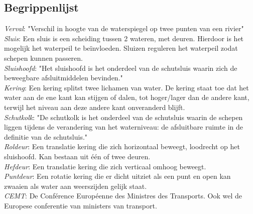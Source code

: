 \documentclass[../verslag.tex]{subfiles}
\begin{document}
\subsection{Begrippenlijst}
\emph{Verval}: "Verschil in hoogte van de waterspiegel op twee punten van een rivier" \cite{dvd_verval}\\
\emph{Sluis}: Een sluis is een scheiding tussen 2 wateren, met deuren. Hierdoor is het mogelijk het waterpeil te beïnvloeden. Sluizen reguleren het waterpeil zodat schepen kunnen passeren. \cite{rws_2022}\\
\emph{Sluishoofd}: "Het sluishoofd is het onderdeel van de schutsluis waarin zich de beweegbare afsluitmiddelen bevinden." \cite{bezuijen_2000}\\
\emph{Kering}: Een kering splitst twee lichamen van water. De kering staat toe dat het water aan de ene kant kan stijgen of dalen, tot hoger/lager dan de andere kant, terwijl het niveau aan deze andere kant onveranderd blijft. \cite{rws_2018}\\
\emph{Schutkolk}: "De schutkolk is het onderdeel van de schutsluis waarin de schepen liggen tijdens de verandering van het waterniveau: de afsluitbare ruimte in de definitie van de schutsluis." \cite{bezuijen_2000}\\
\emph{Roldeur}: Een translatie kering die zich horizontaal beweegt, loodrecht op het sluishoofd. Kan bestaan uit één of twee deuren. \cite{bezuijen_2000}\\
\emph{Hefdeur}: Een translatie kering die zich verticaal omhoog beweegt. \cite{bezuijen_2000}\\
\emph{Puntdeur}: Een rotatie kering die er dicht uitziet als een punt en open kan zwaaien als water aan weerszijden gelijk staat. \cite{bezuijen_2000}\\
\emph{CEMT}: De Conférence Européenne des Ministres des Transports. Ook wel de Europese conferentie van ministers van transport. \cite{cemt_1992}
\end{document}
